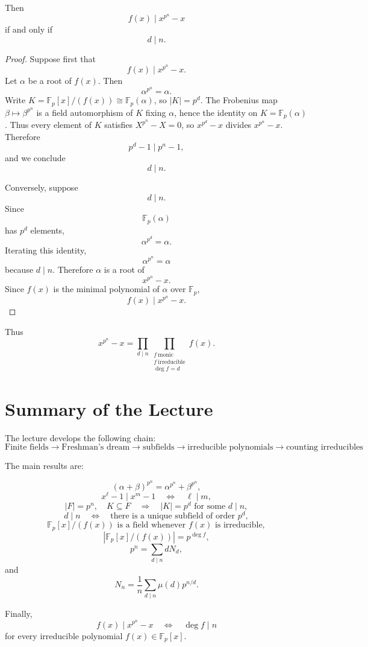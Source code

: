 \documentclass[11pt]{article}
\theoremstyle{remark}
\newcommand{\Fp}{\mathbb F_p}
\begin{document}
Then
\[
    f(x)\mid x^{p^n}-x
\]
if and only if
\[
    d\mid n.
\]

\begin{proof}
Suppose first that
\[
    f(x)\mid x^{p^n}-x.
\]
Let $\alpha$ be a root of $f(x)$. Then
\[
    \alpha^{p^n}=\alpha.
\]
Write $K=\Fp[x]/(f(x))\cong\Fp(\alpha)$, so $|K|=p^d$. The Frobenius map
$\beta\mapsto\beta^{p^n}$ is a field automorphism of $K$ fixing $\alpha$,
hence the identity on $K=\Fp(\alpha)$. Thus every element of $K$ satisfies
$X^{p^n}-X=0$, so $x^{p^d}-x$ divides $x^{p^n}-x$. Therefore
\[
    p^d-1\mid p^n-1,
\]
and we conclude
\[
    d\mid n.
\]

Conversely, suppose
\[
    d\mid n.
\]
Since
\[
    \Fp(\alpha)
\]
has $p^d$ elements,
\[
    \alpha^{p^d}=\alpha.
\]
Iterating this identity,
\[
    \alpha^{p^n}=\alpha
\]
because $d\mid n$. Therefore $\alpha$ is a root of
\[
    x^{p^n}-x.
\]
Since $f(x)$ is the minimal polynomial of $\alpha$ over $\Fp$,
\[
    f(x)\mid x^{p^n}-x.
\]
\end{proof}

Thus
\[
    \boxed{
    x^{p^n}-x
    =
    \prod_{d\mid n}
    \prod_{\substack{f\ \mathrm{monic}\\
                      f\ \mathrm{irreducible}\\
                      \deg f=d}}
    f(x).
    }
\]

\section*{Summary of the Lecture}

The lecture develops the following chain:
\[
\boxed{
\text{Finite fields}
\longrightarrow
\text{Freshman's dream}
\longrightarrow
\text{subfields}
\longrightarrow
\text{irreducible polynomials}
\longrightarrow
\text{counting irreducibles}
}.
\]

The main results are:

\[
    (\alpha+\beta)^{p^n}
    =
    \alpha^{p^n}+\beta^{p^n},
\]
\[
    x^\ell-1\mid x^m-1
    \quad\Longleftrightarrow\quad
    \ell\mid m,
\]
\[
    |F|=p^n,\quad K\subseteq F
    \quad\Longrightarrow\quad
    |K|=p^d\text{ for some }d\mid n,
\]
\[
    d\mid n
    \quad\Longleftrightarrow\quad
    \text{there is a unique subfield of order }p^d,
\]
\[
    \Fp[x]/(f(x))
    \text{ is a field whenever }f(x)\text{ is irreducible},
\]
\[
    |\Fp[x]/(f(x))|=p^{\deg f},
\]
\[
    p^n=\sum_{d\mid n}dN_d,
\]
and
\[
    \boxed{
    N_n
    =
    \frac1n\sum_{d\mid n}\mu(d)p^{n/d}.
    }
\]

Finally,
\[
    \boxed{
    f(x)\mid x^{p^n}-x
    \quad\Longleftrightarrow\quad
    \deg f\mid n
    }
\]
for every irreducible polynomial $f(x)\in\Fp[x]$.
\end{document}
